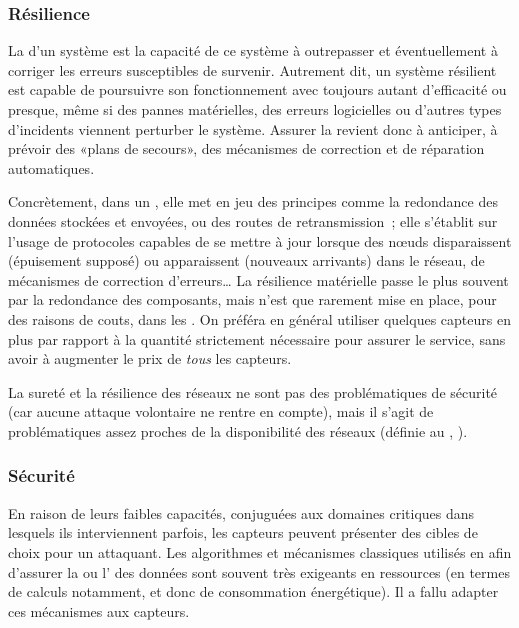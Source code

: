         \subsubsection{Résilience}
La \resilience d'un système est la capacité de ce système à outrepasser et éventuellement à corriger les erreurs susceptibles de survenir.
Autrement dit, un système résilient est capable de poursuivre son fonctionnement avec toujours autant d'efficacité ou presque, même si des pannes matérielles, des erreurs logicielles ou d'autres types d'incidents viennent perturber le système.
Assurer la \resilience revient donc à anticiper, à prévoir des «plans de secours», des mécanismes de correction et de réparation automatiques.

Concrètement, dans un \rcsfs, elle met en jeu des principes comme la redondance des données stockées et envoyées, ou des routes de retransmission~\cite{SP10}; elle s'établit sur l'usage de protocoles capables de se mettre à jour lorsque des nœuds disparaissent (épuisement supposé) ou apparaissent (nouveaux arrivants) dans le réseau, de mécanismes de correction d'erreurs…
La résilience matérielle passe le plus souvent par la redondance des composants, mais n'est que rarement mise en place, pour des raisons de couts, dans les \rcs.
On préféra en général utiliser quelques capteurs en plus par rapport à la quantité strictement nécessaire pour assurer le service, sans avoir à augmenter le prix de \emph{tous} les capteurs.

La sureté et la résilience des réseaux ne sont pas des problématiques de sécurité (car aucune attaque volontaire ne rentre en compte), mais il s'agit de problématiques assez proches de la disponibilité des réseaux (définie au , ).

        \subsubsection{Sécurité}
En raison de leurs faibles capacités, conjuguées aux domaines critiques dans lesquels ils interviennent parfois, les capteurs peuvent présenter des cibles de choix pour un attaquant.
Les algorithmes et mécanismes classiques utilisés en  afin d'assurer la  ou l' des données sont souvent très exigeants en ressources (en termes de calculs notamment, et donc de consommation énergétique).
Il a fallu adapter ces mécanismes aux capteurs.

